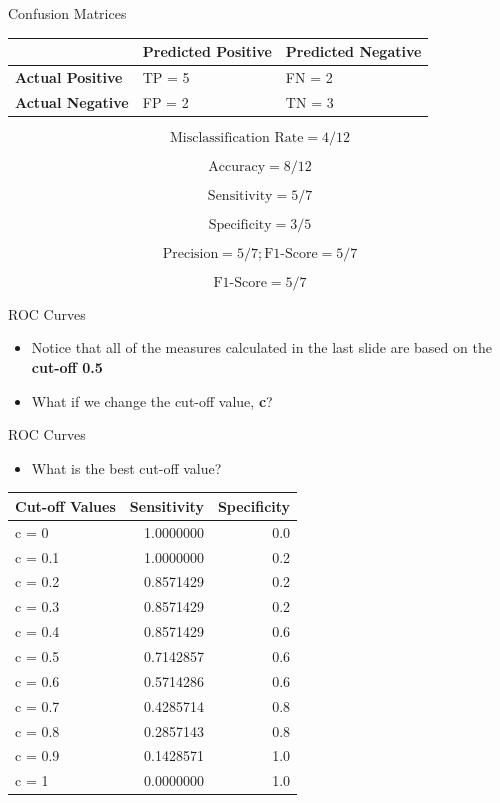 \documentclass[
  ignorenonframetext,
]{beamer}
\providecommand{\tightlist}{%
  \setlength{\itemsep}{0pt}\setlength{\parskip}{0pt}}
\begin{document}
\begin{frame}{Confusion Matrices}
\protect\hypertarget{confusion-matrices-3}{}

\begin{longtable}[]{@{}lll@{}}
\toprule
& Predicted Positive & Predicted Negative\tabularnewline
\midrule
\endhead
\textbf{Actual Positive} & TP = 5 & FN = 2\tabularnewline
\textbf{Actual Negative} & FP = 2 & TN = 3\tabularnewline
\bottomrule
\end{longtable}

\[
\text{Misclassification Rate} =4/12 
\]

\[
\text{Accuracy} = 8/12 
\]

\[
\text{Sensitivity} = 5/7 
\]

\[
\text{Specificity} = 3/5 
\]

\[
\text{Precision} = 5/7; 
\text{F1-Score} = 5/7
\]

\[
\text{F1-Score} = 5/7
\]

\end{frame}

\begin{frame}{ROC Curves}
\protect\hypertarget{roc-curves}{}

\begin{itemize}
\item
  Notice that all of the measures calculated in the last slide are based
  on the \textbf{cut-off 0.5}
\item
  What if we change the cut-off value, \textbf{c}?
\end{itemize}

\end{frame}

\begin{frame}{ROC Curves}
\protect\hypertarget{roc-curves-1}{}

\begin{itemize}
\tightlist
\item
  What is the best cut-off value?
\end{itemize}

\begin{longtable}[]{@{}lrr@{}}
\toprule
Cut-off Values & Sensitivity & Specificity\tabularnewline
\midrule
\endhead
c = 0 & 1.0000000 & 0.0\tabularnewline
c = 0.1 & 1.0000000 & 0.2\tabularnewline
c = 0.2 & 0.8571429 & 0.2\tabularnewline
c = 0.3 & 0.8571429 & 0.2\tabularnewline
c = 0.4 & 0.8571429 & 0.6\tabularnewline
c = 0.5 & 0.7142857 & 0.6\tabularnewline
c = 0.6 & 0.5714286 & 0.6\tabularnewline
c = 0.7 & 0.4285714 & 0.8\tabularnewline
c = 0.8 & 0.2857143 & 0.8\tabularnewline
c = 0.9 & 0.1428571 & 1.0\tabularnewline
c = 1 & 0.0000000 & 1.0\tabularnewline
\bottomrule
\end{longtable}

\end{frame}
\end{document}
